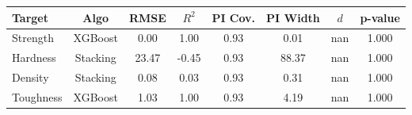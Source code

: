 \begin{tabular}{lccccccc}
\toprule
Target & Algo & RMSE & $R^2$ & PI Cov. & PI Width & $d$ & p-value \\
\midrule
Strength & XGBoost & 0.00 & 1.00 & 0.93 & 0.01 & nan & 1.000 \\
Hardness & Stacking & 23.47 & -0.45 & 0.93 & 88.37 & nan & 1.000 \\
Density & Stacking & 0.08 & 0.03 & 0.93 & 0.31 & nan & 1.000 \\
Toughness & XGBoost & 1.03 & 1.00 & 0.93 & 4.19 & nan & 1.000 \\
\bottomrule
\end{tabular}
